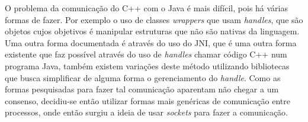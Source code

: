 O problema da comunicação do C++ com o Java é mais difícil, pois há várias formas de fazer. Por exemplo o uso de classes \textit{wrappers} que usam \textit{handles}, que são objetos cujos objetivos é manipular estruturas que não são nativas da linguagem\cite{CppJavaHandle}. Uma outra forma documentada é através do uso do \acrfull{JNI}, que é uma outra forma existente que faz possível através do uso de \textit{handles} chamar código C++ num programa Java\cite{CppJavaJNI}, também existem variações deste método utilizando bibliotecas que busca simplificar de alguma forma o gerenciamento do \textit{handle}. Como as formas pesquisadas para fazer tal comunicação aparentam não chegar a um consenso, decidiu-se então utilizar formas mais genéricas de comunicação entre processos, onde então surgiu a ideia de usar \textit{sockets} para fazer a comunicação.
